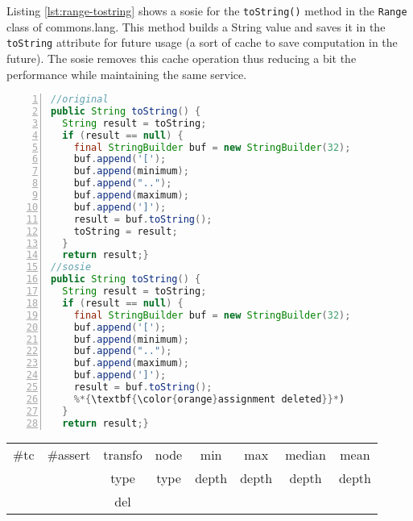 Listing \ref{lst:range-tostring} shows a sosie for the \texttt{toString()} method in the \texttt{Range} class of commons.lang. 
This method builds a String value and saves it in the \texttt{toString} attribute for future usage (a sort of cache to save computation in the future). 
The sosie removes this cache operation thus reducing a bit the performance while maintaining the same service.

\begin{minipage}{\columnwidth}
\begin{lstlisting}[caption={\texttt{toString} in commons.lang and a sosie},label={lst:range-tostring},language=java,numbers=left]
//original
public String toString() {
  String result = toString;
  if (result == null) {
    final StringBuilder buf = new StringBuilder(32);
    buf.append('[');
    buf.append(minimum);
    buf.append("..");
    buf.append(maximum);
    buf.append(']');
    result = buf.toString();
    toString = result;
  }
  return result;}
//sosie
public String toString() {
  String result = toString;
  if (result == null) {
    final StringBuilder buf = new StringBuilder(32);
    buf.append('[');
    buf.append(minimum);
    buf.append("..");
    buf.append(maximum);
    buf.append(']');
    result = buf.toString();
    %*{\textbf{\color{orange}assignment deleted}}*)
  }
  return result;}
\end{lstlisting}
\tabcolsep=0.11cm
\begin{tabular}{>{\small}c>{\small}c>{\small}c>{\small}c>{\small}c>{\small}c>{\small}c>{\small}c}
\hline
\rowcolor{lightgray} \#tc & \#assert & transfo & node & min & max & median & mean   \\
\rowcolor{lightgray}  & & type & type & depth  & depth & depth & depth  \\ 
\hline
&  & del &  &  &  &  & \\
\hline
\end{tabular}
\end{minipage}
